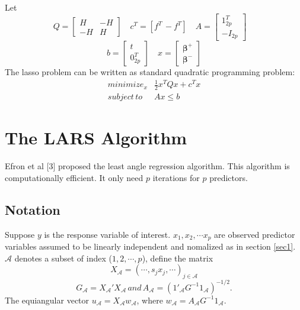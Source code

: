 \documentclass{article} %
\begin{document}
 Let\[
Q=\left[\begin{array}{ll}
H &-H\\
-H & H
\end{array}\right]\quad c^T=\left[f^T \,-f^T\right]\quad A=\left[\begin{array}{l}
1_{2p}^T\\
-I_{2p}
\end{array}\right] \quad\]
\[ b = \left[\begin{array}{l}
t\\
0_{2p}^T\end{array}\right]\quad x = \left[\begin{array}{l}
\bm{\beta}^+\\\bm{\beta}^-
\end{array}\right]
\] The lasso problem can be written as standard quadratic programming problem:$$ \begin{array}{ll}
minimize_x &\frac{1}{2}x^TQx+c^Tx\\
subject\, to & Ax\le b
\end{array}
$$

\section{The LARS Algorithm}
Efron et al [3] proposed the least angle regression algorithm. This algorithm is computationally efficient. It only need $p$ iterations for $p$ predictors.
\subsection{Notation}
Suppose $y$ is the response variable of interest. $x_1,x_2,\cdots x_p$ are observed predictor variables assumed to be linearly independent and nomalized as in section \ref{sec1}. $\mathcal{A}$ denotes a subset of index ($1,2,\cdots,p$), define the matrix $$X_\mathcal{A}=(\cdots,s_jx_j,\cdots)_{j\in\mathcal{A}}$$
\[
G_\mathcal{A}=X_\mathcal{A}'X_\mathcal{A} \, and \, A_\mathcal{A}=(1'_\mathcal{A}G^{-1}1_\mathcal{A})^{-1/2}.
\]
The equiangular vector $u_\mathcal{A}=X_\mathcal{A}w_\mathcal{A}$, where $w_\mathcal{A}=A_\mathcal{A}G^{-1}1_\mathcal{A}$.
\end{document}
